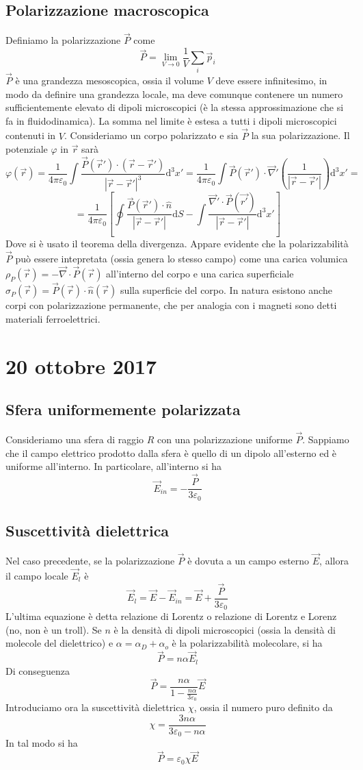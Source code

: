 \documentclass[a4paper,11pt]{book}
\let\oldnabla\nabla
\renewcommand{\nabla}{\vec{\oldnabla}}
\newcommand{\dif}{\mathrm{d}}
\let\oldepsilon\epsilon
\let\oldvarepsilon\varepsilon
\renewcommand{\epsilon}{\oldvarepsilon}
\renewcommand{\varepsilon}{\oldepsilon}
\theoremstyle{definition}
\theoremstyle{theorem}
\begin{document}
\subsection{Polarizzazione macroscopica}
Definiamo la polarizzazione $\vec{P}$ come
\[\vec{P}=\lim_{V\to0}\frac{1}{V}\sum_{i}\vec{p}_i\]
$\vec{P}$ è una grandezza mesoscopica, ossia il volume $V$ deve essere infinitesimo, in modo da definire una grandezza locale, ma deve comunque contenere un numero sufficientemente elevato di dipoli microscopici (è la stessa approssimazione che si fa in fluidodinamica). La somma nel limite è estesa a tutti i dipoli microscopici contenuti in $V$. Consideriamo un corpo polarizzato e sia $\vec{P}$ la sua polarizzazione. Il potenziale $\varphi$ in $\vec{r}$ sarà
\[\varphi(\vec{r})=\frac{1}{4\pi\epsilon_0}\int\frac{\vec{P}(\vec{r}')\cdot\left(\vec{r}-\vec{r}'\right)}{|\vec{r}-\vec{r}'|^3}\dif^3x'=\frac{1}{4\pi\epsilon_0}\int\vec{P}(\vec{r}')\cdot\nabla'\left(\frac{1}{|\vec{r}-\vec{r}'|}\right)\dif^3x'=\]\[=\frac{1}{4\pi\epsilon_0}\left[\oint\frac{\vec{P}(\vec{r}')\cdot\hat{n}}{|\vec{r}-\vec{r}'|}\dif S-\int\frac{\nabla'\cdot\vec{P}(\vec{r'})}{|\vec{r}-\vec{r}'|}\dif^3x'\right]\]
Dove si è usato il teorema della divergenza. Appare evidente che la polarizzabilità $\vec{P}$ può essere intepretata (ossia genera lo stesso campo) come una carica volumica $\rho_P(\vec{r})=-\nabla\cdot\vec{P}(\vec{r})$ all'interno del corpo e una carica superficiale $\sigma_P(\vec{r})=\vec{P}(\vec{r})\cdot\hat{n}(\vec{r})$ sulla superficie del corpo. In natura esistono anche corpi con polarizzazione permanente, che per analogia con i magneti sono detti materiali ferroelettrici.
\section{20 ottobre 2017}
\subsection{Sfera uniformemente polarizzata}
Consideriamo una sfera di raggio $R$ con una polarizzazione uniforme $\vec{P}$. Sappiamo che il campo elettrico prodotto dalla sfera è quello di un dipolo all'esterno ed è uniforme all'interno. In particolare, all'interno si ha
\[\vec{E}_{in}=-\frac{\vec{P}}{3\epsilon_0}\]
\subsection{Suscettività dielettrica}
Nel caso precedente, se la polarizzazione $\vec{P}$ è dovuta a un campo esterno $\vec{E}$, allora il campo locale $\vec{E}_{l}$ è
\[\vec{E}_{l}=\vec{E}-\vec{E}_{in}=\vec{E}+\frac{\vec{P}}{3\epsilon_0}\] 
L'ultima equazione è detta relazione di Lorentz o relazione di Lorentz e Lorenz (no, non è un troll). Se $n$ è la densità di dipoli microscopici (ossia la densità di molecole del dielettrico) e $\alpha=\alpha_D+\alpha_o$ è la polarizzabilità molecolare, si ha
\[\vec{P}=n\alpha\vec{E}_l\]
Di conseguenza 
\[\vec{P}=\frac{n\alpha}{1-\frac{n\alpha}{3\epsilon_0}}\vec{E}\]
Introduciamo ora la suscettività dielettrica $\chi$, ossia il numero puro definito da
\[\chi=\frac{3n\alpha}{3\epsilon_0-n\alpha}\]
In tal modo si ha
\[\vec{P}=\epsilon_0\chi\vec{E}\]
\end{document}
